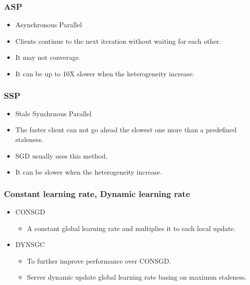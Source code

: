 \begin{frame}
    \frametitle{ASP}
    \begin{itemize}
		\item Asynchronous Parallel
		\item Clients continue to the next iteration without waiting for each other. 
		\item It may not converage. 
		\item It can be up to 10X slower when the heterogeneity increase.
	\end{itemize}
\end{frame}

\begin{frame}
    \frametitle{SSP}
    \begin{itemize}
		\item Stale Synchrnous Parallel
		\item The faster client can not go ahead the slowest one more than a predefined staleness. 
		\item SGD usually uses this method. 
		\item It can be slower when the heterogeneity increase.
	\end{itemize}
\end{frame}

\begin{frame}
    \frametitle{Constant learning rate, Dynamic learning rate}
    \begin{itemize}
		\item CONSGD
		\begin{itemize}
			\item A constant global learning rate and multiplies it to each local update.
		\end{itemize}
		\item DYNSGC
		\begin{itemize}
			\item To further improve performance over CONSGD.
			\item Server dynamic update global learning rate basing on maximun staleness.
		\end{itemize}
	\end{itemize}
\end{frame}




